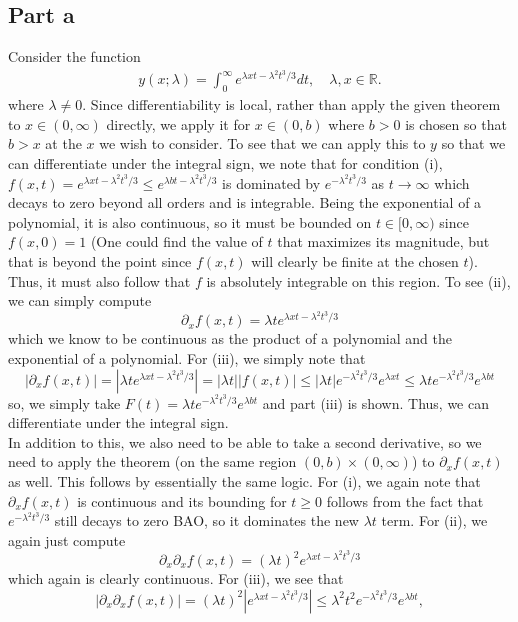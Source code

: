 \documentclass{article}
\begin{document}
\subsection{Part a}
Consider the function
  \begin{align*}
    y(x;\lambda) = \int_0^\infty e^{\lambda x t - \lambda ^2 t^3/3} d t, \quad \lambda, x \in \mathbb R.
  \end{align*}
where $\lambda\neq0$. Since differentiability is local, rather than apply the given theorem to $x\in(0,\infty)$ directly, we apply it for $x\in(0,b)$ where $b>0$ is chosen so that $b>x$ at the $x$ we wish to consider. To see that we can apply this to $y$ so that we can differentiate under the integral sign, we note that for condition (i), $f(x,t)=e^{\lambda x t - \lambda ^2 t^3/3}\leq e^{\lambda b t - \lambda ^2 t^3/3}$ is dominated by $e^{- \lambda ^2 t^3/3}$ as $t\to\infty$ which decays to zero beyond all orders and is integrable. Being the exponential of a polynomial, it is also continuous, so it must be bounded on $t\in[0,\infty)$ since $f(x,0)=1$ (One could find the value of $t$ that maximizes its magnitude, but that is beyond the point since $f(x,t)$ will clearly be finite at the chosen $t$). Thus, it must also follow that $f$ is absolutely integrable on this region. To see (ii), we can simply compute 
\[
\partial_x f(x,t)=\lambda te^{\lambda x t - \lambda ^2 t^3/3}
\]
which we know to be continuous as the product of a polynomial and the exponential of a polynomial. For (iii), we  simply note that 
\[
|\partial_x f(x,t)|=|\lambda te^{\lambda x t - \lambda ^2 t^3/3}|=|\lambda t||f(x,t)|\leq |\lambda t|e^{- \lambda ^2 t^3/3}e^{\lambda x t}\leq\lambda te^{- \lambda ^2 t^3/3}e^{\lambda b t}
\]
so, we simply take $F(t)=\lambda te^{- \lambda ^2 t^3/3}e^{\lambda b t}$ and part (iii) is shown. Thus, we can differentiate under the integral sign. \\
In addition to this, we also need to be able to take a second derivative, so we need to apply the theorem (on the same region $(0,b)\times(0,\infty)$) to $\partial_x f(x,t)$ as well. This follows by essentially the same logic. For (i), we again note that $\partial_x f(x,t)$ is continuous and its bounding for $t\geq0$ follows from the fact that $e^{- \lambda ^2 t^3/3}$ still decays to zero BAO, so it dominates the new $\lambda t$ term. For (ii), we again just compute 
\[
\partial_x \partial_xf(x,t)=(\lambda t)^2e^{\lambda x t - \lambda ^2 t^3/3}
\]
which again is clearly continuous. For (iii), we see that 
\[
|\partial_x \partial_xf(x,t)|=(\lambda t)^2|e^{\lambda x t - \lambda ^2 t^3/3}|\leq \lambda^2 t^2e^{- \lambda ^2 t^3/3}e^{\lambda b t},
\]
\end{document}
